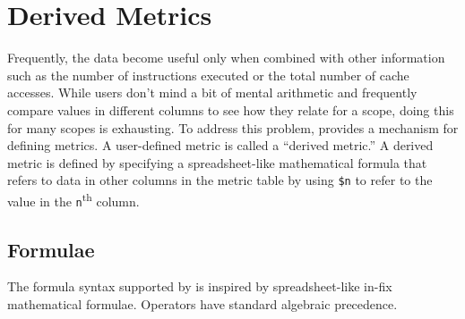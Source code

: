 \section{Derived Metrics}
\label{sec:hpcviewer:derived-metrics}

Frequently, the data become useful only when combined with other information such as the number of instructions executed or the total number of cache accesses.
While users don't mind a bit of mental arithmetic and frequently compare values in different columns to see how they relate for a scope, doing this for many scopes is exhausting.
To address this problem, \hpcviewer{} provides a mechanism for defining metrics.
A user-defined metric is called a ``derived metric.''
A derived metric is defined by specifying a spreadsheet-like mathematical formula that refers to data in other columns in the metric table by using \texttt{\$n} to refer to the value in the \texttt{n}\textsuperscript{th} column.


\subsection{Formulae}

The formula syntax supported by \hpcviewer{} is inspired by spreadsheet-like in-fix mathematical formulae.
Operators have standard algebraic precedence.
%



